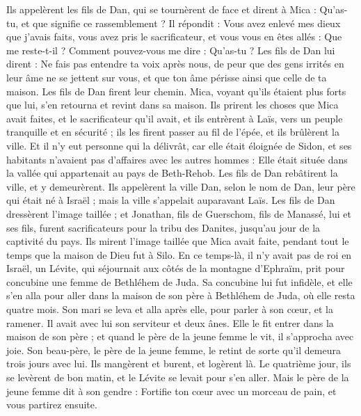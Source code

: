 \begin{multicols}{2}
Ils appelèrent les fils de Dan, qui se tournèrent de face et dirent à Mica : Qu'as-tu, et que signifie ce rassemblement ?
Il répondit : Vous avez enlevé mes dieux que j'avais faits, vous avez pris le sacrificateur, et vous vous en êtes allés : Que me reste-t-il ? Comment pouvez-vous me dire : Qu'as-tu ?
Les fils de Dan lui dirent : Ne fais pas entendre ta voix après nous, de peur que des gens irrités en leur âme ne se jettent sur vous, et que ton âme périsse ainsi que celle de ta maison.
Les fils de Dan firent leur chemin. Mica, voyant qu'ils étaient plus forts que lui, s'en retourna et revint dans sa maison.
Ils prirent les choses que Mica avait faites, et le sacrificateur qu'il avait, et ils entrèrent à Laïs, vers un peuple tranquille et en sécurité ; ils les firent passer au fil de l'épée, et ils brûlèrent la ville.
Et il n'y eut personne qui la délivrât, car elle était éloignée de Sidon, et ses habitants n'avaient pas d'affaires avec les autres hommes : Elle était située dans la vallée qui appartenait au pays de Beth-Rehob. Les fils de Dan rebâtirent la ville, et y demeurèrent.
Ils appelèrent la ville Dan, selon le nom de Dan, leur père qui était né à Israël ; mais la ville s'appelait auparavant Laïs.
Les fils de Dan dressèrent l'image taillée ; et Jonathan, fils de Guerschom, fils de Manassé, lui et ses fils, furent sacrificateurs pour la tribu des Danites, jusqu'au jour de la captivité du pays.
Ils mirent l'image taillée que Mica avait faite, pendant tout le temps que la maison de Dieu fut à Silo.
\VerseOne{}En ce temps-là, il n'y avait pas de roi en Israël, un Lévite, qui séjournait aux côtés de la montagne d'Ephraïm, prit pour concubine une femme de Bethléhem de Juda.
Sa concubine lui fut infidèle, et elle s'en alla pour aller dans la maison de son père à Bethléhem de Juda, où elle resta quatre mois.
Son mari se leva et alla après elle, pour parler à son cœur, et la ramener. Il avait avec lui son serviteur et deux ânes. Elle le fit entrer dans la maison de son père ; et quand le père de la jeune femme le vit, il s'approcha avec joie.
Son beau-père, le père de la jeune femme, le retint de sorte qu'il demeura trois jours avec lui. Ils mangèrent et burent, et logèrent là.
Le quatrième jour, ils se levèrent de bon matin, et le Lévite se levait pour s'en aller. Mais le père de la jeune femme dit à son gendre : Fortifie ton cœur avec un morceau de pain, et vous partirez ensuite.

\end{multicols}
